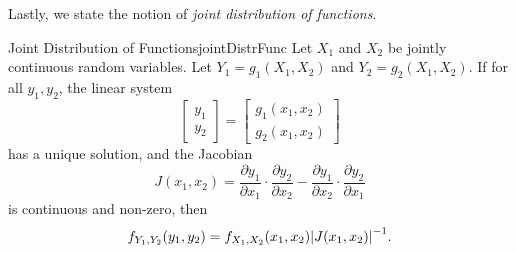 \documentclass[math]{amznotes}
\theoremstyle{remark}
\begin{document}
Lastly, we state the notion of \textit{joint distribution of functions}.
\begin{thmbox}{Joint Distribution of Functions}{jointDistrFunc}
    Let $X_1$ and $X_2$ be jointly continuous random variables. Let $Y_1 = g_1(X_1, X_2)$ and $Y_2 = g_2(X_1, X_2)$. If for all $y_1, y_2$, the linear system
    \begin{equation*}
        \begin{bmatrix}
            y_1 \\
            y_2
        \end{bmatrix} = \begin{bmatrix}
            g_1(x_1, x_2) \\
            g_2(x_1, x_2)
        \end{bmatrix}
    \end{equation*}
    has a unique solution, and the Jacobian
    \begin{equation*}
        J(x_1, x_2) = \frac{\partial y_1}{\partial x_1}\cdot\frac{\partial y_2}{\partial x_2} - \frac{\partial y_1}{\partial x_2}\cdot \frac{\partial y_2}{\partial x_1}
    \end{equation*}
    is continuous and non-zero, then
    \begin{equation*}
        f_{Y_1, Y_2}(y_1, y_2) = f_{X_1, X_2}(x_1, x_2){\left\lvert {J(x_1, x_2)} \right\rvert}^{-1}.
    \end{equation*}
\end{thmbox}
\end{document}

